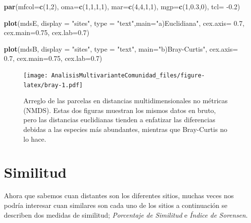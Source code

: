 \documentclass[]{book}
\newenvironment{Shaded}{\begin{snugshade}}{\end{snugshade}}
\newcommand{\KeywordTok}[1]{\textcolor[rgb]{0.13,0.29,0.53}{\textbf{{#1}}}}
\newcommand{\DataTypeTok}[1]{\textcolor[rgb]{0.13,0.29,0.53}{{#1}}}
\newcommand{\DecValTok}[1]{\textcolor[rgb]{0.00,0.00,0.81}{{#1}}}
\newcommand{\FloatTok}[1]{\textcolor[rgb]{0.00,0.00,0.81}{{#1}}}
\newcommand{\StringTok}[1]{\textcolor[rgb]{0.31,0.60,0.02}{{#1}}}
\newcommand{\NormalTok}[1]{{#1}}
\begin{document}
\begin{Shaded}
\begin{Highlighting}[]
\KeywordTok{par}\NormalTok{(}\DataTypeTok{mfcol=}\KeywordTok{c}\NormalTok{(}\DecValTok{1}\NormalTok{,}\DecValTok{2}\NormalTok{), }\DataTypeTok{oma=}\KeywordTok{c}\NormalTok{(}\DecValTok{1}\NormalTok{,}\DecValTok{1}\NormalTok{,}\DecValTok{1}\NormalTok{,}\DecValTok{1}\NormalTok{), }\DataTypeTok{mar=}\KeywordTok{c}\NormalTok{(}\DecValTok{4}\NormalTok{,}\DecValTok{4}\NormalTok{,}\DecValTok{1}\NormalTok{,}\DecValTok{1}\NormalTok{),}
    \DataTypeTok{mgp=}\KeywordTok{c}\NormalTok{(}\DecValTok{1}\NormalTok{,}\FloatTok{0.3}\NormalTok{,}\DecValTok{0}\NormalTok{), }\DataTypeTok{tcl=} \NormalTok{-}\FloatTok{0.2}\NormalTok{)}

\KeywordTok{plot}\NormalTok{(mdsE, }\DataTypeTok{display =} \StringTok{"sites"}\NormalTok{, }
     \DataTypeTok{type =} \StringTok{"text"}\NormalTok{,}\DataTypeTok{main=}\StringTok{"a)Euclidiana"}\NormalTok{, }
     \DataTypeTok{cex.axis=} \FloatTok{0.7}\NormalTok{, }\DataTypeTok{cex.main=}\FloatTok{0.75}\NormalTok{, }\DataTypeTok{cex.lab=}\FloatTok{0.7}\NormalTok{)}

\KeywordTok{plot}\NormalTok{(mdsB, }\DataTypeTok{display =} \StringTok{"sites"}\NormalTok{, }\DataTypeTok{type =} \StringTok{"text"}\NormalTok{, }
     \DataTypeTok{main=}\StringTok{"b)Bray-Curtis"}\NormalTok{, }
     \DataTypeTok{cex.axis=} \FloatTok{0.7}\NormalTok{, }\DataTypeTok{cex.main=}\FloatTok{0.75}\NormalTok{, }\DataTypeTok{cex.lab=}\FloatTok{0.7}\NormalTok{)}
\end{Highlighting}
\end{Shaded}

\begin{figure}[htbp]
\centering
\texttt{[image: AnalisisMultivarianteComunidad\_files/figure-latex/bray-1.pdf]}
\caption{\label{fig:bray}Arreglo de las parcelas en distancias
multidimensionales no métricas (NMDS). Estas dos figuras muestran los
mismos datos en bruto, pero las distancias euclidianas tienden a
enfatizar las diferencias debidas a las especies más abundantes,
mientras que Bray-Curtis no lo hace.}
\end{figure}

\section{Similitud}\label{similitud}

Ahora que sabemos cuan distantes son los diferentes sitios, muchas veces
nos podría interesar cuan similares son cada uno de los sitios a
continuación se describen dos medidas de similitud; \emph{Porcentaje de
Similitud} e \emph{Índice de Sorensen}.
\end{document}
